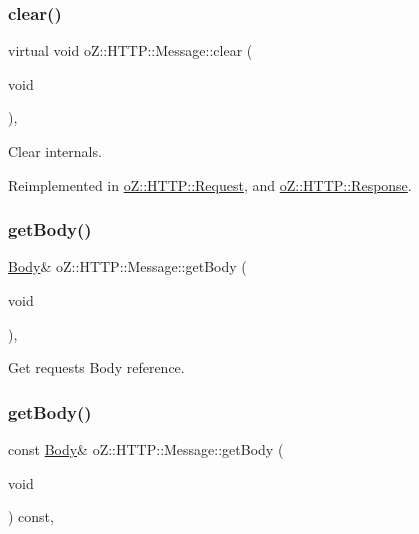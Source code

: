 \subsubsection{\texorpdfstring{clear()}{clear()}}
{\footnotesize\ttfamily virtual void o\+Z\+::\+H\+T\+T\+P\+::\+Message\+::clear (\begin{DoxyParamCaption}\item[{void}]{ }\end{DoxyParamCaption})\hspace{0.3cm}{\ttfamily [inline]}, {\ttfamily [virtual]}}



Clear internals. 



Reimplemented in \mbox{\hyperlink{classo_z_1_1_h_t_t_p_1_1_request_ac6611fadb3515ab2667ee96b8d93ef1d}{o\+Z\+::\+H\+T\+T\+P\+::\+Request}}, and \mbox{\hyperlink{classo_z_1_1_h_t_t_p_1_1_response_a2bce180e3288f0bd78a9fbc2a74b608c}{o\+Z\+::\+H\+T\+T\+P\+::\+Response}}.

\mbox{\label{classo_z_1_1_h_t_t_p_1_1_message_aed4d82d784cf503dbbfa1180f9b3434f}} 
\subsubsection{\texorpdfstring{getBody()}{getBody()}\hspace{0.1cm}{\footnotesize\ttfamily [1/2]}}
{\footnotesize\ttfamily \mbox{\hyperlink{namespaceo_z_1_1_h_t_t_p_a270c38b9f9b6228ce430fda6d5b150d6}{Body}}\& o\+Z\+::\+H\+T\+T\+P\+::\+Message\+::get\+Body (\begin{DoxyParamCaption}\item[{void}]{ }\end{DoxyParamCaption})\hspace{0.3cm}{\ttfamily [inline]}, {\ttfamily [noexcept]}}



Get request\textquotesingle{}s Body reference. 

\mbox{\label{classo_z_1_1_h_t_t_p_1_1_message_ad06f3f586945dad61b206607f340f4e1}} 
\subsubsection{\texorpdfstring{getBody()}{getBody()}\hspace{0.1cm}{\footnotesize\ttfamily [2/2]}}
{\footnotesize\ttfamily const \mbox{\hyperlink{namespaceo_z_1_1_h_t_t_p_a270c38b9f9b6228ce430fda6d5b150d6}{Body}}\& o\+Z\+::\+H\+T\+T\+P\+::\+Message\+::get\+Body (\begin{DoxyParamCaption}\item[{void}]{ }\end{DoxyParamCaption}) const\hspace{0.3cm}{\ttfamily [inline]}, {\ttfamily [noexcept]}}



